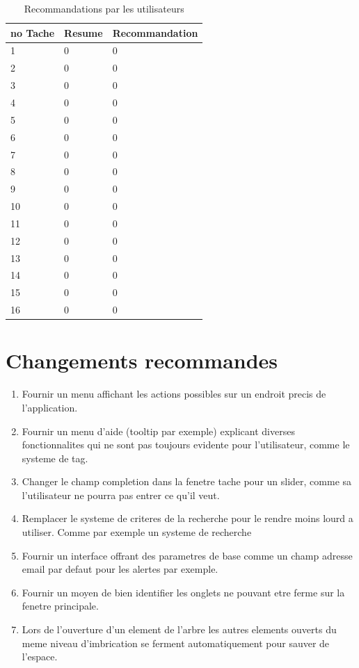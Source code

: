 \documentclass[letterpaper, oneside, 12pt, these, creativecommons]{thETS}
\begin{document}
\begin{table}
	\centering
	\begin{tabular}{|l|l|l|}
	\hline
	no Tache	& Resume	& Recommandation 	\\ \hline
	1		& 0		& 0 			\\ \hline
	2		& 0		& 0 			\\ \hline
	3		& 0		& 0 			\\ \hline
	4		& 0		& 0 			\\ \hline
	5		& 0		& 0 			\\ \hline
	6		& 0		& 0 			\\ \hline
	7		& 0		& 0 			\\ \hline
	8		& 0		& 0 			\\ \hline
	9		& 0		& 0 			\\ \hline
	10		& 0		& 0 			\\ \hline
	11		& 0		& 0 			\\ \hline
	12		& 0		& 0 			\\ \hline
	13		& 0		& 0 			\\ \hline
	14		& 0		& 0 			\\ \hline
	15		& 0		& 0 			\\ \hline
	16		& 0		& 0 			\\ \hline
	\end{tabular}
	\caption{Recommandations par les utilisateurs}
\end{table}

\chapter{Changements recommandes}

\begin{enumerate}
	\item Fournir un menu affichant les actions possibles sur un endroit precis de l'application.
	\item Fournir un menu d'aide (tooltip par exemple) explicant diverses fonctionnalites qui ne sont pas toujours evidente pour l'utilisateur, comme le systeme de tag.
	\item Changer le champ completion dans la fenetre tache pour un slider, comme sa l'utilisateur ne pourra pas entrer ce qu'il veut.
	\item Remplacer le systeme de criteres de la recherche pour le rendre moins lourd a utiliser. Comme par exemple un systeme de recherche
	\item Fournir un interface offrant des parametres de base comme un champ adresse email par defaut pour les alertes par exemple.
	\item Fournir un moyen de bien identifier les onglets ne pouvant etre ferme sur la fenetre principale.
	\item Lors de l'ouverture d'un element de l'arbre les autres elements ouverts du meme niveau d'imbrication se ferment automatiquement pour sauver de l'espace.
\end{enumerate}
\end{document}
